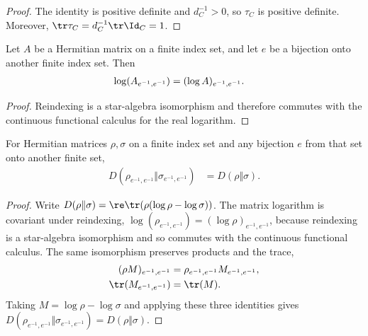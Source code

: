 \begin{proof}\leanok
    The identity is positive definite and $d_C^{-1}>0$, so $\tau_C$ is positive
    definite. Moreover, $\tr\tau_C=d_C^{-1}\tr\Id_C=1$.
\end{proof}

\begin{theorem}
    \label{thm:log_submatrix_equiv}
    \leanok
    Let $A$ be a Hermitian matrix on a finite index set, and let $e$ be a
    bijection onto another finite index set. Then
    \begin{align}
        \log(A_{e^{-1},e^{-1}})
        &=(\log A)_{e^{-1},e^{-1}}.
        \notag
    \end{align}
\end{theorem}

\begin{proof}\leanok
    Reindexing is a star-algebra isomorphism and therefore commutes with the
    continuous functional calculus for the real logarithm.
\end{proof}

\begin{lemma}
    \label{lem:relative_entropy_submatrix_equiv}
    \leanok
    For Hermitian matrices $\rho,\sigma$ on a finite index set and any bijection
    $e$ from that set onto another finite set,
    \begin{align}
        D(\rho_{e^{-1},e^{-1}}\Vert\sigma_{e^{-1},e^{-1}})
         & =D(\rho\Vert\sigma).
        \label{eq:entropy_reindexing}
    \end{align}
\end{lemma}

\begin{proof}\leanok
    Write
    $D(\rho\Vert\sigma)
        =\re\tr(\rho(\log\rho-\log\sigma))$.
    The matrix logarithm is covariant under reindexing,
    $\log(\rho_{e^{-1},e^{-1}})
        =(\log\rho)_{e^{-1},e^{-1}}$, because reindexing is a
    star-algebra isomorphism and so commutes with the continuous functional
    calculus. The same isomorphism preserves products and the trace,
    \begin{align}
        (\rho M)_{e^{-1},e^{-1}}
         & =\rho_{e^{-1},e^{-1}}M_{e^{-1},e^{-1}},
        \notag                                     \\
        \tr(M_{e^{-1},e^{-1}})
         & =\tr(M).
        \notag
    \end{align}
    Taking $M=\log\rho-\log\sigma$ and applying these three identities gives
    $D(\rho_{e^{-1},e^{-1}}\Vert\sigma_{e^{-1},e^{-1}})
        =D(\rho\Vert\sigma)$.
\end{proof}

